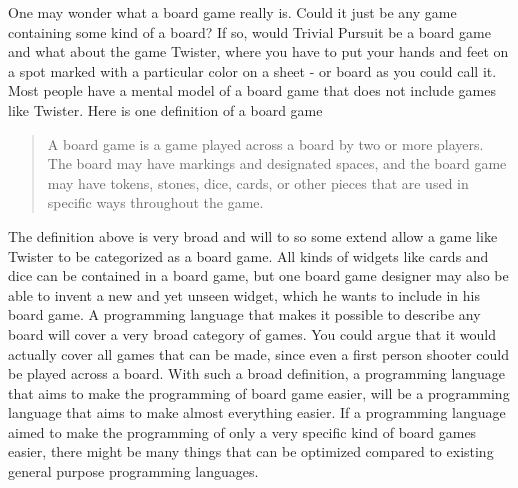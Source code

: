 One may wonder what a board game really is. Could it just be any game containing some kind of a board? If so, would Trivial Pursuit be a board game and what about the game Twister, where you have to put your hands and feet on a spot marked with a particular color on a sheet - or board as you could call it. Most people have a mental model of a board game that does not include games like Twister. Here is one definition of a board game
\begin{quote}
A board game is a game played across a board by two or more players. The board may have markings and designated spaces, and the board game may have tokens, stones, dice, cards, or other pieces that are used in specific ways throughout the game.
\end{quote} %
The definition above is very broad and will to so some extend allow a game like Twister to be categorized as a board game. All kinds of widgets like cards and dice can be contained in a board game, but one board game designer may also be able to invent a new and yet unseen widget, which he wants to include in his board game. A programming language that makes it possible to describe any board will cover a very broad category of games. You could argue that it would actually cover all games that can be made, since even a first person shooter could be played across a board. With such a broad definition, a programming language that aims to make the programming of board game easier, will be a programming language that aims to make almost everything easier.
If a programming language aimed to make the programming of only a very specific kind of board games easier, there might be many things that can be optimized compared to existing general purpose programming languages.